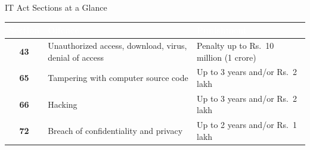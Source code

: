 \documentclass[aspectratio=169,11pt,xcolor={table}]{beamer}
\begin{document}
\begin{frame}{IT Act Sections at a Glance}
  \centering
  \renewcommand{\arraystretch}{1.6}
  \begin{tabular}{>{\bfseries}c >{\raggedright\arraybackslash}p{5.2cm} >{\raggedright\arraybackslash}p{5.2cm}}
    \toprule
    \rowcolor{navy}\textcolor{white}{Section} & \textcolor{white}{\textbf{Offence}} & \textcolor{white}{\textbf{Punishment}}\\
    \midrule
    \textcolor{ocean}{43} & Unauthorized access, download, virus, denial of access & Penalty up to Rs.\ 10 million (1 crore)\\
    \textcolor{grape}{65} & Tampering with computer source code & Up to 3 years and/or Rs.\ 2 lakh\\
    \textcolor{brick}{66} & Hacking & Up to 3 years and/or Rs.\ 2 lakh\\
    \textcolor{amber!80!black}{72} & Breach of confidentiality and privacy & Up to 2 years and/or Rs.\ 1 lakh\\
    \bottomrule
  \end{tabular}
  \vspace{4mm}

\end{frame}
\end{document}
